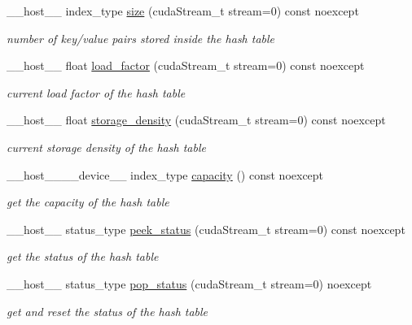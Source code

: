 \begin{DoxyCompactItemize}
\+\_\+\+\_\+host\+\_\+\+\_\+ index\+\_\+type \hyperlink{classwarpcore_1_1CountingHashTable_aa331f755c38f5b073ed7e58e3ad59777}{size} (cuda\+Stream\+\_\+t stream=0) const noexcept
\begin{DoxyCompactList}\small\item\em number of key/value pairs stored inside the hash table \end{DoxyCompactList}\item 
\+\_\+\+\_\+host\+\_\+\+\_\+ float \hyperlink{classwarpcore_1_1CountingHashTable_ad4a829b15a3add41133437c17ab6bf67}{load\+\_\+factor} (cuda\+Stream\+\_\+t stream=0) const noexcept
\begin{DoxyCompactList}\small\item\em current load factor of the hash table \end{DoxyCompactList}\item 
\+\_\+\+\_\+host\+\_\+\+\_\+ float \hyperlink{classwarpcore_1_1CountingHashTable_aa7b5b49d50edc280ce007cf92abdc4ae}{storage\+\_\+density} (cuda\+Stream\+\_\+t stream=0) const noexcept
\begin{DoxyCompactList}\small\item\em current storage density of the hash table \end{DoxyCompactList}\item 
\+\_\+\+\_\+host\+\_\+\+\_\+\+\_\+\+\_\+device\+\_\+\+\_\+ index\+\_\+type \hyperlink{classwarpcore_1_1CountingHashTable_a05cdc2ffc3c11c2b10d90b3d8812e96d}{capacity} () const noexcept
\begin{DoxyCompactList}\small\item\em get the capacity of the hash table \end{DoxyCompactList}\item 
\+\_\+\+\_\+host\+\_\+\+\_\+ status\+\_\+type \hyperlink{classwarpcore_1_1CountingHashTable_ae9e388f29dae1952c2da7fed32415e35}{peek\+\_\+status} (cuda\+Stream\+\_\+t stream=0) const noexcept
\begin{DoxyCompactList}\small\item\em get the status of the hash table \end{DoxyCompactList}\item 
\+\_\+\+\_\+host\+\_\+\+\_\+ status\+\_\+type \hyperlink{classwarpcore_1_1CountingHashTable_a9313aefeadf39f1c0512f131859922ab}{pop\+\_\+status} (cuda\+Stream\+\_\+t stream=0) noexcept
\begin{DoxyCompactList}\small\item\em get and reset the status of the hash table \end{DoxyCompactList}\item 

\end{DoxyCompactItemize}
